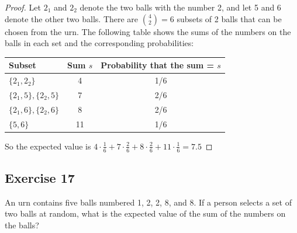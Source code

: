 \documentclass[14pt]{extarticle}
\begin{document}
\begin{proof}
     Let \(2_1\) and \(2_2\) denote the two balls with the number 2, and let 5 and 6 denote the other two balls. There are
     \(\binom{4}{2} = 6\) subsets of 2 balls that can be chosen from the urn. The following table shows the sums of the
     numbers on the balls in each set and the corresponding probabilities:
     \begin{center}
          \begin{tabular}{|l|c|c|}
               \hline
               {\bf Subset}             & {\bf Sum \(s\)} & {\bf Probability that the sum = \(s\)} \\
               \hline
               \(\{2_1, 2_2\}\)         & 4               & 1/6                                    \\
               \hline
               \(\{2_1,5\}, \{2_2,5\}\) & 7               & 2/6                                    \\
               \hline
               \(\{2_1,6\}, \{2_2,6\}\) & 8               & 2/6                                    \\
               \hline
               \(\{5,6\}\)              & 11              & 1/6                                    \\
               \hline
          \end{tabular}
     \end{center}
     So the expected value is \(4\cdot\frac{1}{6} + 7\cdot \frac{2}{6} + 8 \cdot \frac{2}{6} + 11 \cdot \frac{1}{6} = 7.5\)
\end{proof}

\subsection{Exercise 17}
An urn contains five balls numbered 1, 2, 2, 8, and 8. If a person selects a set of two balls at random, what is the
expected value of the sum of the numbers on the balls?
\end{document}
